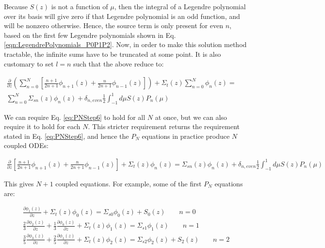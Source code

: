 \documentclass[10pt]{article}
\begin{document}
\begin{flushleft}
Because \(S(z)\) is not a function of \(\mu\), then the integral of a Legendre polynomial over its basis will give zero if that Legendre polynomial is an odd function, and will be nonzero otherwise. Hence, the source term is only present for even \(n\), based on the first few Legendre polynomials shown in Eq. \eqref{eqn:LegendrePolynomials_P0P1P2}. Now, in order to make this solution method tractable, the infinite sums have to be truncated at some point. It is also customary to set \(l=n\) such that the above reduce to:

\begin{equation}
\label{eq:PNStep6}
\begin{aligned}
\frac{\partial}{\partial z}\left(\sum_{n=0}^{N}\left\lbrack\frac{n+1}{2n+1}\phi_{n+1}(z) +\frac{n}{2n+1} \phi_{n-1}(z)\right\rbrack\right) + \Sigma_t(z)\sum_{n=0}^{N}\phi_n(z) =\quad\quad\\
\sum_{n=0}^{N}\Sigma_{sn}(z)\phi_n(z) +  \delta_{n,even}\frac{1}{2}\int_{-1}^{1}d\mu S(z)P_n(\mu)
 \end{aligned}
 \end{equation}

We can require Eq. \eqref{eq:PNStep6} to hold for all \(N\) at once, but we can also require it to hold for each \(N\). This stricter requirement returns the requirement stated in Eq. \eqref{eq:PNStep6}, and hence the \(P_N\) equations in practice produce \(N\) coupled ODEs:

\begin{equation}
\label{eq:PNEquations}
\begin{aligned}
\frac{\partial}{\partial z}\left\lbrack\frac{n+1}{2n+1}\phi_{n+1}(z) +\frac{n}{2n+1} \phi_{n-1}(z)\right\rbrack + \Sigma_t(z)\phi_n(z) =
\Sigma_{sn}(z)\phi_n(z) +  \delta_{n,even}\frac{1}{2}\int_{-1}^{1}d\mu S(z)P_n(\mu)
 \end{aligned}
 \end{equation}

This gives \(N+1\) coupled equations. For example, some of the first \(P_N\) equations are:
 
 \begin{equation}
 \begin{aligned}
\frac{\partial\phi_{1}(z)}{\partial z} + \Sigma_t(z)\phi_0(z)=\Sigma_{s0}\phi_0(z)+ S_0(z)\quad\quad n=0\\
\frac{2}{3}\frac{\partial\phi_{2}(z)}{\partial z}+\frac{1}{3}\frac{\partial\phi_{0}(z)}{\partial z} + \Sigma_t(z)\phi_1(z)=\Sigma_{s1}\phi_1(z)\quad\quad n=1\\
\frac{3}{5}\frac{\partial\phi_{3}(z)}{\partial z}+\frac{2}{5}\frac{\partial\phi_{1}(z)}{\partial z} + \Sigma_t(z)\phi_2(z)=\Sigma_{s2}\phi_2(z)+ S_2(z)\quad\quad n=2\\
\end{aligned}
\end{equation}


\end{flushleft}
\end{document}
